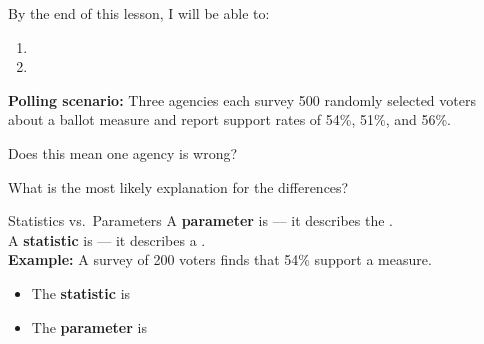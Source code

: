 \documentclass[10pt]{article}
\begin{document}
\namedateperiod

\vspace{0.15in}

\begin{objectivebox}
By the end of this lesson, I will be able to:
\begin{enumerate}
  \item \writeline
  \item \writeline
\end{enumerate}
\end{objectivebox}

\vspace{0.1in}

\begin{vocabbox}
\end{vocabbox}

\vspace{0.1in}

\begin{hookbox}
\textbf{Polling scenario:} Three agencies each survey 500 randomly selected voters
about a ballot measure and report support rates of 54\%, 51\%, and 56\%.

Does this mean one agency is wrong? \writeline

What is the most likely explanation for the differences? \writeline
\end{hookbox}

\vspace{0.1in}

\begin{notesbox}{Statistics vs.\ Parameters}
A \textbf{parameter} is \blank{8cm} --- it describes the \blank{3.5cm}.\\[6pt]
A \textbf{statistic} is \blank{8cm} --- it describes a \blank{3cm}.\\[10pt]

\textbf{Example:} A survey of 200 voters finds that 54\% support a measure.
\begin{itemize}
  \item The \textbf{statistic} is \blank{6cm}
  \item The \textbf{parameter} is \blank{6cm}
\end{itemize}
\end{notesbox}

\vspace{0.1in}
\end{document}

